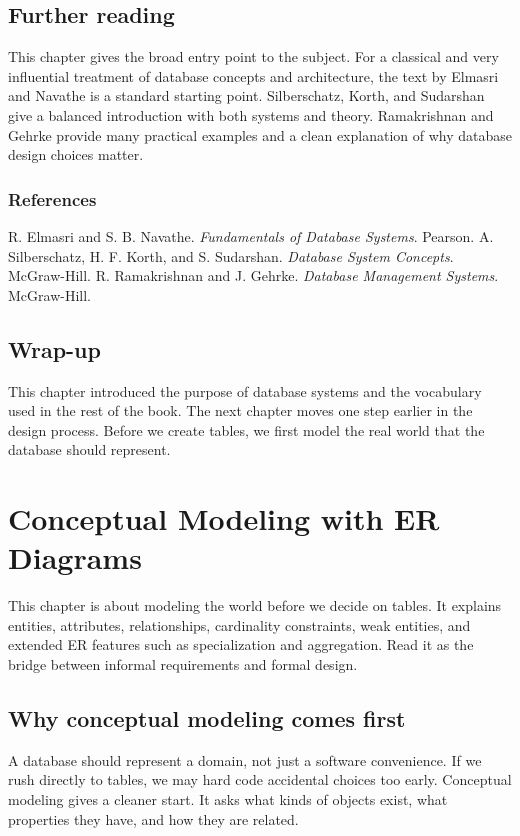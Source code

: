 \documentclass[11pt,a4paper,openany]{book}
\makeatletter
\renewenvironment{thebibliography}[1]
 {\subsection*{References}%
  \list{\@biblabel{\@arabic\c@enumiv}}%
   {\settowidth\labelwidth{\@biblabel{#1}}%
    \leftmargin\labelwidth\advance\leftmargin\labelsep
    \usecounter{enumiv}\let\p@enumiv\@empty
    \renewcommand\theenumiv{\@arabic\c@enumiv}}%
  \sloppy\clubpenalty4000\widowpenalty4000}
 {\endlist}
\makeatother
\begin{document}
\section{Further reading}
This chapter gives the broad entry point to the subject. For a classical and very influential treatment of database concepts and architecture, the text by Elmasri and Navathe is a standard starting point. Silberschatz, Korth, and Sudarshan give a balanced introduction with both systems and theory. Ramakrishnan and Gehrke provide many practical examples and a clean explanation of why database design choices matter.

\begin{thebibliography}{9}
R. Elmasri and S. B. Navathe.
\textit{Fundamentals of Database Systems}. Pearson.
A. Silberschatz, H. F. Korth, and S. Sudarshan.
\textit{Database System Concepts}. McGraw-Hill.
R. Ramakrishnan and J. Gehrke.
\textit{Database Management Systems}. McGraw-Hill.
\end{thebibliography}

\section{Wrap-up}
This chapter introduced the purpose of database systems and the vocabulary used in the rest of the book. The next chapter moves one step earlier in the design process. Before we create tables, we first model the real world that the database should represent.

\chapter[Conceptual Modeling]{Conceptual Modeling with ER Diagrams}
\label{ch:er}
\begin{guidancebox}
This chapter is about modeling the world before we decide on tables. It explains entities, attributes, relationships, cardinality constraints, weak entities, and extended ER features such as specialization and aggregation. Read it as the bridge between informal requirements and formal design.
\end{guidancebox}

\section{Why conceptual modeling comes first}
A database should represent a domain, not just a software convenience. If we rush directly to tables, we may hard code accidental choices too early. Conceptual modeling gives a cleaner start. It asks what kinds of objects exist, what properties they have, and how they are related.
\end{document}
